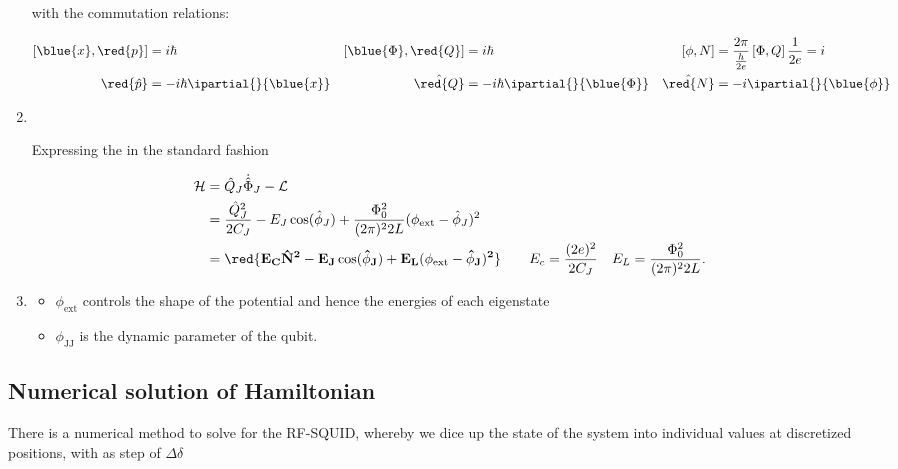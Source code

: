 \begin{enumerate}
  \noindent with the commutation relations:

  \begin{align}
    \left[\blue{x},\red{p}\right] & =i\hbar & \left[\blue{\Phi},\red{Q}\right] & = i\hbar & \left[\phi,N\right] & = \frac{2\pi}{\frac{h}{2e}}\left[\Phi,Q\right]\frac{1}{2e} = i\\
    \red{\hat{p}} & = -i\hbar\ipartial{}{\blue{x}} & \hat{\red{Q}} & =-i\hbar\ipartial{}{\blue{\Phi}} & \hat{\red{N}} & =-i\ipartial{}{\blue{\phi}}
  \end{align}

\item\

\begin{framed}\noindent
  Expressing the  in the standard fashion

  \begin{equation}
    \begin{aligned}
      \mathcal{H} & = \hat{Q}_J\dot{\hat{\Phi}}_J - \mathcal{L}\\
      & = \frac{\hat{Q}_J^2}{2C_J} - E_J\cos(\hat{\phi}_J) + \frac{\Phi_0^2}{(2\pi)^22L}(\phi_\text{ext}-\hat{\phi}_J)^2\\
      &    =   \mathbf{\red{E_C{\hat{N}^2}-    E_J\cos(\hat{\phi}_J)   +
          E_L(\phi_\text{ext}-\hat{\phi}_J)^2}}\qquad        E_c       =
      \frac{(2e)^2}{2C_J}\quad E_L = \frac{\Phi_0^2}{(2\pi)^22L}.
    \end{aligned}
  \end{equation}
\end{framed}

\item{}
  \begin{itemize}
  \item $  \phi_{\text{ext}} $ controls  the shape of the  potential and
    hence the energies of each eigenstate
  \item $ \phi_{\text{JJ}} $ is the dynamic parameter of the qubit.
  \end{itemize}
\end{enumerate}

\newpage
\subsection{Numerical                     solution                    of
  Hamiltonian\label{subsec:flux_numerical}}
  There is a numerical  method to solve
for  the RF-SQUID,  whereby we  dice  up the  state of  the system  into
individual   values  at   discretized   positions,  with   as  step   of
$ \Delta \delta $

